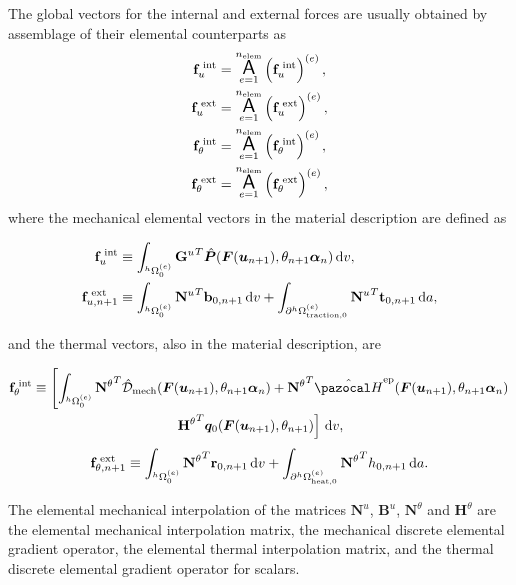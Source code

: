 The global vectors for the internal and external forces are usually obtained by assemblage of their elemental counterparts as
\begin{gather}
    \mathbf f_u^\text{\;int} = \operatorname*{\text{\Large $ \mathsf{A} $}}_{e=1}^{n_\text{elem}} \left(\mathbf f_u^\text{\;int}\right)^{(e)},\\
    \mathbf f_u^\text{\;ext} = \operatorname*{\text{\Large $ \mathsf{A} $}}_{e=1}^{n_\text{elem}} \left(\mathbf f_u^\text{\;ext}\right)^{(e)},\\
    \mathbf f_\theta^\text{\;int} = \operatorname*{\text{\Large $ \mathsf{A} $}}_{e=1}^{n_\text{elem}} \left(\mathbf f_\theta^\text{\;int}\right)^{(e)},\\
    \mathbf f_\theta^\text{\;ext} = \operatorname*{\text{\Large $ \mathsf{A} $}}_{e=1}^{n_\text{elem}} \left(\mathbf f_\theta^\text{\;ext}\right)^{(e)},
\end{gather}
where the mechanical elemental vectors in the material description are defined as
\begin{highlight}[innertopmargin=-5pt]
    \begin{align}
        \mathbf f_u^\text{\;int} &\equiv \int_{^h\Omega_0^{(e)}}{\mathbf G^{u}}^T \hat{\bm{P}}(\bm{F}(\bm u_{n+1}), \theta_{n+1} \bm \alpha_n)\,\mathrm{d} v,\\
        \mathbf f^\text{\;ext}_{u,n+1} &\equiv \int_{^h\Omega_0^{(e)}}{\mathbf N^{u}}^T \mathbf b_{0,n+1}\,\mathrm{d} v + \int_{\partial^h\Omega_\text{traction,0}^{(e)}}{\mathbf N^{u}}^T \mathbf t_{0,n+1}\,\mathrm{d} a,
    \end{align}
\end{highlight}
and the thermal vectors, also in the material description, are
\begin{highlight}[innertopmargin=-5pt]
\begin{multline}
    \mathbf f_\theta^\text{\;int} \equiv \left[\int_{^h\Omega_0^{(e)}}{\mathbf N^{\theta}}^T \hat{\mathcal D}_\text{mech}(\mat F(\bm u_{n+1}), \theta_{n+1} \bm \alpha_n) +{\mathbf N^{\theta}}^T\hat{\pazocal H}^\text{ep}(\mat F(\bm u_{n+1}), \theta_{n+1} \bm \alpha_n)\right.\\
     \left. {\mathbf H^{\theta}}^T\bm q_0(\bm F(\bm u_{n+1}), \theta_{n+1})\right] \ud v,
\end{multline}
\begin{equation}
    \mathbf f^\text{\;ext}_{\theta,n+1} \equiv \int_{^h\Omega_0^{(e)}}{\mathbf N^{\theta}}^T \mathbf r_{0,n+1}\,\mathrm{d} v + \int_{\partial^h\Omega_\text{heat,0}^{(e)}}{\mathbf N^{\theta}}^T h_{0,n+1}\,\mathrm{d} a.
\end{equation}
\end{highlight}
The elemental mechanical interpolation of the matrices $\mathbf N^u$, $\mathbf B^u$, \(\mathbf N^\theta\) and $\mathbf H^\theta$ are the elemental mechanical interpolation matrix, the mechanical discrete elemental gradient operator, the elemental thermal interpolation matrix, and the thermal discrete elemental gradient operator for scalars.

